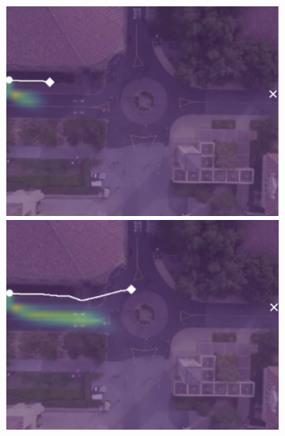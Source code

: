 \documentclass[letterpaper,10pt,conference]{ieeeconf}
\begin{document}
\begin{figure}[t!]
\begin{subfigure}[t]{0.48\textwidth}
	\vspace{0.1cm}
	\begin{minipage}[c]{0.47cm}
	\end{minipage}
	\begin{minipage}[c]{0.3\linewidth}
		\includegraphics[width=\linewidth]{./figures/comparison/kit_death_1_2_t=70.jpg}
	\end{minipage}
	\begin{minipage}[c]{0.3\linewidth}
		\includegraphics[width=\linewidth]{./figures/comparison/kit_death_1_2_t=250.jpg}
	\end{minipage}
	\begin{minipage}[c]{0.3\linewidth}

\end{minipage}
\end{subfigure}
\end{figure}
\end{document}
